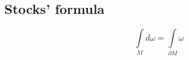 \documentclass[a4paper, 12pt]{article}
\begin{document}
    \subsection*{Stocks' formula}
    \[
        \int\limits_{M} d\omega = \int\limits_{\partial M} \omega
    \]
\end{document}
